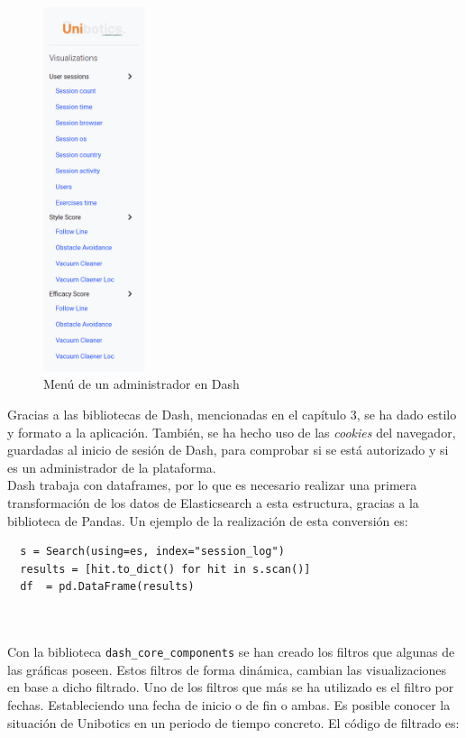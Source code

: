 \begin{figure}[H]
    \centering
    \includegraphics[width=3cm, keepaspectratio]{img/menu.png}
    \caption{Menú de un administrador en Dash}
    \label{fig:menu}
\end{figure}


Gracias a las bibliotecas de Dash, mencionadas en el capítulo 3, se ha dado estilo y formato a la aplicación. También, se ha hecho uso de las \textit{cookies }del navegador, guardadas al inicio de sesión de Dash, para comprobar si se está autorizado y si es un administrador de la plataforma.\\

Dash trabaja con dataframes, por lo que es necesario realizar una primera transformación de los datos de Elasticsearch a esta estructura, gracias a la biblioteca de Pandas. Un ejemplo de la realización de esta conversión es:

{\footnotesize
\begin{verbatim}
  s = Search(using=es, index="session_log")
  results = [hit.to_dict() for hit in s.scan()]
  df  = pd.DataFrame(results)
\end{verbatim}
}
\\
\\
Con la biblioteca \texttt{dash\_core\_components} se han creado los filtros que algunas de las gráficas poseen. Estos filtros de forma dinámica, cambian las visualizaciones en base a dicho filtrado. Uno de los filtros que más se ha utilizado es el filtro por fechas. Estableciendo una fecha de inicio o de fin o ambas. Es posible conocer la situación de Unibotics en un periodo de tiempo concreto. El código de filtrado es:

